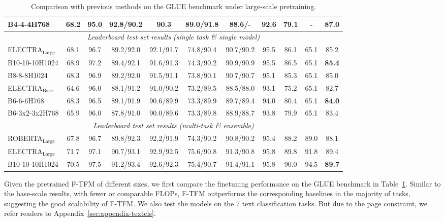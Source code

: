 \documentclass{article}
\theoremstyle{custom}
\begin{document}
\begin{table}[!ht]
\begin{tabular}{l|c@{\hskip 0.05in}c@{\hskip 0.05in}c@{\hskip 0.05in}c@{\hskip 0.05in}c@{\hskip 0.05in}c@{\hskip 0.05in}c@{\hskip 0.05in}c@{\hskip 0.05in}c@{\hskip 0.05in}|c}
		B4-4-4H768
		& 68.2 & 95.0 & 92.8/90.2 & 90.3 & 89.0/91.8 & 88.6/- & 92.6 & 79.1 & - & 87.0 \\
		\midrule
		\multicolumn{11}{c}{\textit{Leaderboard test set results (single task \& single model)}} \\
		\midrule
		ELECTRA$_\text{Large}$~\cite{clark2020electra}
		& 68.1 & 96.7 & 89.2/92.0 & 92.1/91.7 & 74.8/90.4 & 90.7/90.2 & 95.5 & 86.1 & 65.1 & 85.2 \\
		B10-10-10H1024 
		& 68.9 & 97.2 & 89.4/92.1 & 91.6/91.3 & 74.3/90.2 & 90.9/90.9 & 95.5 & 86.5 & 65.1 & \bf 85.4 \\
		B8-8-8H1024
		& 68.3 & 96.9 & 89.2/92.0 & 91.5/91.1 & 73.8/90.1 & 90.7/90.7 & 95.1 & 85.3 & 65.1 & 85.0 \\
		\cmidrule(r){1-1} \cmidrule(lr){2-10} \cmidrule(l){11-11}
		ELECTRA$_\text{Base}$~\cite{clark2020electra}
		& 64.6 & 96.0 & 88.1/91.2 & 91.0/90.2 & 73.2/89.5 & 88.5/88.0 & 93.1 & 75.2 & 65.1 & 82.7  \\
		B6-6-6H768
		& 68.3 & 96.5 & 89.1/91.9 & 90.6/89.9 & 73.3/89.9 & 89.7/89.4 & 94.0 & 80.4 & 65.1 & \bf 84.0 \\
		B6-3x2-3x2H768
		& 65.9 & 96.0 & 87.8/91.0 & 90.0/89.6 & 73.3/89.8 & 88.9/88.7 & 93.8 & 79.9 & 65.1 & 83.4 \\
		\midrule
		\multicolumn{11}{c}{\textit{Leaderboard test set results (multi-task \& ensemble)}} \\
		\midrule
		ROBERTA$_\text{Large}$~\cite{liu2019roberta}
		& 67.8 & 96.7 & 89.8/92.3 & 92.2/91.9 & 74.3/90.2 & 90.8/90.2 & 95.4 & 88.2 & 89.0 & 88.1 \\
		ELECTRA$_\text{Large}$~\cite{clark2020electra}
		& 71.7 & 97.1 & 90.7/93.1 & 92.9/92.5 & 75.6/90.8 & 91.3/90.8 & 95.8 & 89.8 & 91.8 & 89.4 \\
		B10-10-10H1024
		& 70.5 & 97.5 & 91.2/93.4 & 92.6/92.3 & 75.4/90.7 & 91.4/91.1 & 95.8 & 90.0 & 94.5 & \bf 89.7 \\
		\bottomrule 
	\end{tabular}
	\caption{Comparison with previous methods on the GLUE benchmark under large-scale pretraining.}
	\label{tab:large-scale-glue}
	\vspace{-1em}
\end{table}
Given the pretrained F-TFM of different sizes, we first compare the finetuning performance on the GLUE benchmark in Table~\ref{tab:large-scale-glue}.
Similar to the base-scale results, with fewer or comparable FLOPs, F-TFM outperforms the corresponding baselines in the majority of tasks, suggesting the good scalability of F-TFM.
We also test the models on the 7 text classification tasks.
But due to the page constraint, we refer readers to Appendix~\ref{sec:appendix-textcls}.
\end{document}

